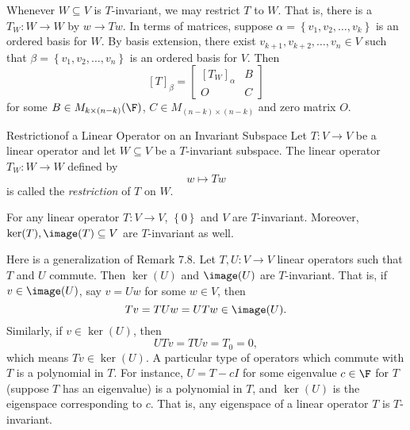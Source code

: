 \documentclass[linearalgebra]{subfiles}
\begin{document}
    \begin{remark}
        Whenever $W\subseteq V$ is $T$-invariant, we may restrict $T$ to $W$. That is, there is a $T_W:W\to W$ by $w\to Tw$. In terms of matrices, suppose $\alpha = \left\lbrace v_1, v_2, \ldots, v_k \right\rbrace$ is an ordered basis for $W$. By basis extension, there exist $v_{k+1}, v_{k+2}, \ldots, v_n\in V$ such that $\beta = \left\lbrace v_1, v_2, \ldots, v_n \right\rbrace$ is an ordered basis for $V$. Then
        \begin{equation*}
            \left[ T \right]_\beta = \begin{bmatrix} \left[ T_W \right] _\alpha & B \\ O & C \end{bmatrix}
        \end{equation*}
        for some $B\in M_{k\times (n-k)}(\F)$, $C\in M_{(n-k)\times (n-k)}$ and zero matrix $O$.
    \end{remark}

    \begin{definition}{Restriction}{of a Linear Operator on an Invariant Subspace}
        Let $T:V\to V$ be a linear operator and let $W\subseteq V$ be a $T$-invariant subspace. The linear operator $T_W:W\to W$ defined by
        \begin{equation*}
            w\mapsto Tw
        \end{equation*}
        is called the \emph{restriction} of $T$ on $W$.
    \end{definition}

    \begin{remark}
        For any linear operator $T:V\to V$, $\left\lbrace 0 \right\rbrace$ and $V$ are $T$-invariant. Moreover, $\ker(T), \image(T)\subseteq V$ are $T$-invariant as well.
    \end{remark}

    \begin{remark}
        Here is a generalization of Remark 7.8. Let $T, U:V\to V$ linear operators such that $T$ and $U$ commute. Then $\ker(U)$ and $\image(U)$ are $T$-invariant. That is, if $v\in\image(U)$, say $v=Uw$ for some $w\in V$, then
        \begin{equation*}
            Tv = TUw = UTw \in\image(U).
        \end{equation*}
        Similarly, if $v\in\ker(U)$, then
        \begin{equation*}
            UTv = TUv = T_0 = 0,
        \end{equation*}
        which means $Tv\in\ker(U)$. A particular type of operators which commute with $T$ is a polynomial in $T$. For instance, $U = T-cI$ for some eigenvalue $c\in\F$ for $T$ (suppose $T$ has an eigenvalue) is a polynomial in $T$, and $\ker(U)$ is the eigenspace corresponding to $c$. That is, any eigenspace of a linear operator $T$ is $T$-invariant.
    \end{remark}
\end{document}
